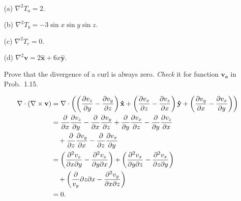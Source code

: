         \begin{sol}[1.26]~\\
            (a) $\nabla^2 T_a=2$.

            \noindent (b) $\nabla^2 T_b = -3\sin x \sin y\sin z$.

            \noindent (c) $\nabla^2 T_c = 0$.

            \noindent (d) $\nabla^2 \mathbf{v}=2\mathbf{\hat{x}} + 6x\mathbf{\hat{y}}$.
        \end{sol}

        \begin{prob}[1.27] Prove that the divergence of a curl is always zero. \textit{Check} it for function $\mathbf{v_a}$ in Prob.~1.15.
        \end{prob}

        \begin{sol}[1.27]
            \begin{equation}
                \begin{aligned}
                    \nabla\cdot(\nabla\times\mathbf{v}) &= \nabla\cdot\left(\left(\frac{\partial v_z}{\partial y} - \frac{\partial v_y}{\partial z}\right)\mathbf{\hat{x}} + \left(\frac{\partial v_x}{\partial z} - \frac{\partial v_z}{\partial x}\right)\mathbf{\hat{y}} + \left(\frac{\partial v_y}{\partial x} - \frac{\partial v_x}{\partial y}\right)\right) \\
                    &=\frac{\partial }{\partial x}\frac{\partial v_z}{\partial y} - \frac{\partial }{\partial x}\frac{\partial v_y}{\partial z} + \frac{\partial }{\partial y}\frac{\partial v_x}{\partial z} - \frac{\partial }{\partial y}\frac{\partial v_z}{\partial x}\\ 
                    &\quad + \frac{\partial }{\partial z}\frac{\partial v_y}{\partial x} - \frac{\partial }{\partial z}\frac{\partial v_x}{\partial y} \\
                    &=\left(\frac{\partial^2v_z}{\partial x\partial y} -\frac{\partial^2v_z}{\partial y\partial x}\right) + \left(\frac{\partial^2v_x}{\partial y\partial z} - \frac{\partial^2v_x}{\partial z\partial y}\right) \\
                    &\quad + \left(\frac\partial{v_y}{\partial z\partial x} - \frac{\partial^2v_y}{\partial x\partial z}\right)\\
                    &=0.
                \end{aligned}
            \end{equation}
        \end{sol}
